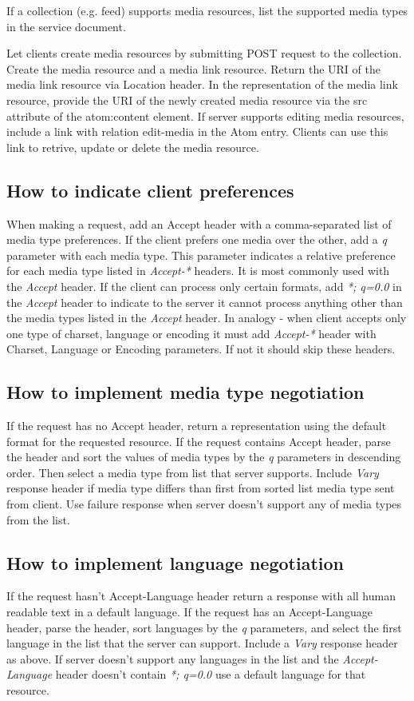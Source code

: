 \documentclass[11pt,a4paper]{article}
\begin{document}
If a collection (e.g. feed) supports media resources, list the supported media types in the service document.

Let clients create media resources by submitting POST request to the collection. Create the media resource and a media link resource. Return the URI of the media link resource via Location header. In the representation of the media link resource, provide the URI of the newly created media resource via the src attribute of the atom:content element. If server supports editing media resources, include a link with relation edit-media in the Atom entry. Clients can use this link to retrive, update or delete the media resource.

\subsection{How to indicate client preferences}
When making a request, add an Accept header with a comma-separated list of media type preferences. If the client prefers one media over the other, add a \textit{q} parameter with each media type. This parameter indicates a relative preference for each media type listed in \textit{Accept-*} headers. It is most commonly used with the \textit{Accept} header. If the client can process only certain formats, add \textit{*; q=0.0} in the \textit{Accept} header to indicate to the server it cannot process anything other than the media types listed in the \textit{Accept} header. In analogy - when client accepts only one type of charset, language or encoding it must add \textit{Accept-*} header with Charset, Language or Encoding parameters. If not it should skip these headers.

\subsection{How to implement media type negotiation}
If the request has no Accept header, return a representation using the default format for the requested resource. If the request contains Accept header, parse the header and sort the values of media types by the \textit{q} parameters in descending order. Then select a media type from list that server supports. Include \textit{Vary} response header if media type differs than first from sorted list media type sent from client. Use failure response when server doesn't support any of media types from the list.

\subsection{How to implement language negotiation}
If the request hasn't Accept-Language header return a response with all human readable text in a default language. If the request has an Accept-Language header, parse the header, sort languages by the \textit{q} parameters, and select the first language in the list that the server can support. Include a \textit{Vary} response header as above. If server doesn't support any languages in the list and the \textit{Accept-Language} header doesn't contain \textit{*; q=0.0} use a default language for that resource.
\end{document}
